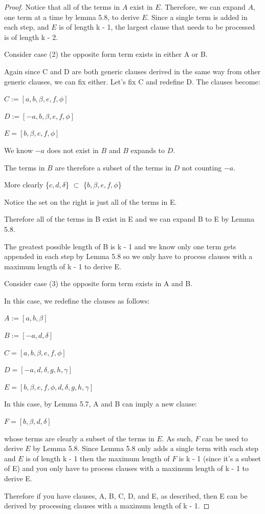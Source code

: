\documentclass[manuscript]{acmart}
\begin{document}
\begin{proof}
        Notice that all of the terms in $A$ exist in $E$. Therefore, we
        can expand $A$, one term at a time by lemma 5.8, to derive
        $E$. Since a single term is added in each step, and $E$ is of length k - 1,
        the largest clause that needs to be processed is of length k - 2.

        Consider case (2) the opposite form term exists in either A or B.

        Again since C and D are both generic clauses derived in the same
        way from other generic clauses, we can fix either. Let's fix C
        and redefine D. The clauses become:

        $C := [a, b, \beta, e, f, \phi]$

        $D := [-a, b, \beta, e, f, \phi]$

        $E = [b, \beta, e, f, \phi]$

        We know $-a$ does not exist in $B$ and $B$ expands to $D$.

        The terms in $B$ are therefore a subset of the terms in $D$ not counting
        $-a$.

        More clearly \{$c, d, \delta$\} $\subset$ \{$b, \beta, e, f, \phi$\}

        Notice the set on the right is just all of the terms in E.

        Therefore all of the terms in B exist in E and we can expand
        B to E by Lemma 5.8.

        The greatest possible length of B is k - 1 and we know only one
        term gets appended in each step by Lemma 5.8 so we only have to
        process clauses with a maximum length of k - 1 to derive E.

        Consider case (3) the opposite form term exists in A and B.

        In this case, we redefine the clauses as follows:

        $A := [a, b, \beta]$

        $B := [-a, d, \delta]$

        $C = [a, b, \beta, e, f, \phi]$

        $D = [-a, d, \delta, g, h, \gamma]$

        $E = [b, \beta, e, f, \phi, d, \delta, g, h, \gamma]$

        In this case, by Lemma 5.7, A and B can imply a new clause:

        $F = [b, \beta, d, \delta]$

        whose terms are clearly a subset of the terms in $E$. As such, 
        $F$ can be used to derive $E$ by Lemma 5.8. Since Lemma 5.8 only
        adds a single term with each step and $E$ is of length k - 1 then
        the maximum length of $F$ is k - 1 (since it's a subset of E) and 
        you only have to process clauses with a maximum length of k - 1
        to derive E. 

        Therefore if you have clauses, A, B, C, D, and E, as described,
        then E can be derived by processing clauses with a maximum length
        of k - 1.
    \end{proof}
\end{document}
